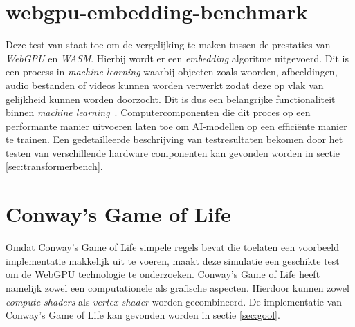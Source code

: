 \break{}

\section{webgpu-embedding-benchmark}

Deze test van \textcite{Lochner2024} staat toe om de vergelijking te maken tussen de prestaties van \textit{WebGPU} en \textit{WASM}. Hierbij wordt er een \textit{embedding} algoritme uitgevoerd. Dit is een process in \textit{machine learning} waarbij objecten zoals woorden, afbeeldingen, audio bestanden of videos kunnen worden verwerkt zodat deze op vlak van gelijkheid kunnen worden doorzocht. Dit is dus een belangrijke functionaliteit binnen \textit{machine learning}~\autocite{Cloudflare2024}. Computercomponenten die dit proces op een performante manier uitvoeren laten toe om AI-modellen op een efficiënte manier te trainen. Een gedetailleerde beschrijving van testresultaten bekomen door het testen van verschillende hardware componenten kan gevonden worden in sectie \ref{sec:transformerbench}.

\section{Conway's Game of Life}

Omdat Conway's Game of Life simpele regels bevat die toelaten een voorbeeld implementatie makkelijk uit te voeren, maakt deze simulatie een geschikte test om de WebGPU technologie te onderzoeken. Conway's Game of Life heeft namelijk zowel een computationele als grafische aspecten. Hierdoor kunnen zowel \textit{compute shaders} als \textit{vertex shader} worden gecombineerd. De implementatie van Conway's Game of Life kan gevonden worden in sectie \ref{sec:gool}.